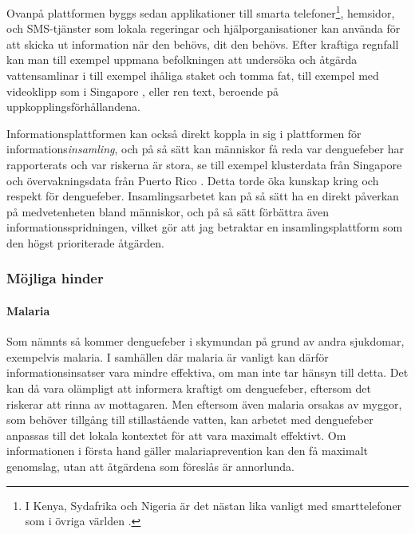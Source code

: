 \documentclass{article}
\begin{document}
Ovanpå plattformen byggs sedan applikationer till smarta telefoner\footnote{I Kenya, Sydafrika och Nigeria är det nästan lika vanligt med smarttelefoner som i övriga världen \cite[s. 3]{ericsson}.}, hemsidor, och SMS-tjänster som lokala regeringar och hjälporganisationer kan använda för att skicka ut information när den behövs, dit den behövs. Efter kraftiga regnfall kan man till exempel uppmana befolkningen att undersöka och åtgärda vattensamlinar i till exempel ihåliga staket och tomma fat, till exempel med videoklipp som i Singapore \cite{Singapore:video}, eller ren text, beroende på uppkopplingsförhållandena.
 
Informationsplattformen kan också direkt koppla in sig i plattformen för informations\emph{insamling}, och på så sätt kan människor få reda var denguefeber har rapporterats och var riskerna är stora, se till exempel klusterdata från Singapore \cite{Singapore:clusters} och övervakningsdata från Puerto Rico \cite[s. 73]{WHO:2009}. Detta torde öka kunskap kring och respekt för denguefeber. Insamlingsarbetet kan på så sätt ha en direkt påverkan på medvetenheten bland människor, och på så sätt förbättra även informationsspridningen, vilket gör att jag betraktar en insamlingsplattform som den högst prioriterade åtgärden.

\subsubsection{Möjliga hinder}

\paragraph{Malaria}
Som nämnts så kommer denguefeber i skymundan på grund av andra sjukdomar, exempelvis malaria. I samhällen där malaria är vanligt kan därför informationsinsatser vara mindre effektiva, om man inte tar hänsyn till detta. Det kan då vara olämpligt att informera kraftigt om denguefeber, eftersom det riskerar att rinna av mottagaren. Men eftersom även malaria orsakas av myggor, som behöver tillgång till stillastående vatten, kan arbetet med denguefeber anpassas till det lokala kontextet för att vara maximalt effektivt. Om informationen i första hand gäller malariaprevention kan den få maximalt genomslag, utan att åtgärdena som föreslås är annorlunda.
\end{document}
